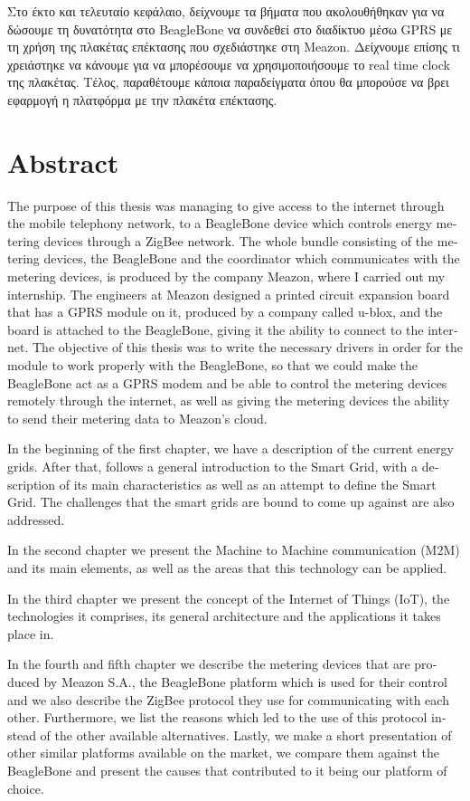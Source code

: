 \documentclass[12pt, a4paper, oneside]{report}
\begin{document}
Στο έκτο και τελευταίο κεφάλαιο, δείχνουμε τα βήματα που ακολουθήθηκαν για να δώσουμε τη δυνατότητα στο BeagleBone να συνδεθεί στο διαδίκτυο μέσω GPRS με τη χρήση της πλακέτας επέκτασης που σχεδιάστηκε στη Meazon. Δείχνουμε επίσης τι χρειάστηκε να κάνουμε για να μπορέσουμε να χρησιμοποιήσουμε το real time clock της πλακέτας. Τέλος, παραθέτουμε κάποια παραδείγματα όπου θα μπορούσε να βρει εφαρμογή η πλατφόρμα με την πλακέτα επέκτασης.

\clearpage
\section*{\textenglish{Abstract}}
\begin{english}The purpose of this thesis was managing to give access to the internet through the mobile telephony network, to a BeagleBone device which controls energy metering devices through a ZigBee network. The whole bundle consisting of the metering devices, the BeagleBone and the coordinator which communicates with the metering devices, is produced by the company Meazon, where I carried out my internship. The engineers at Meazon designed a printed circuit expansion board that has a GPRS module on it, produced by a company called u-blox, and the board is attached to the BeagleBone, giving it the ability to connect to the internet. The objective of this thesis was to write the necessary drivers in order for the module to work properly with the BeagleBone, so that we could make the BeagleBone act as a GPRS modem and be able to control the metering devices remotely through the internet, as well as giving the metering devices the ability to send their metering data to Meazon's cloud.

In the beginning of the f\mbox{}irst chapter, we have a description of the current energy grids. After that, follows a general introduction to the Smart Grid, with a description of its main characteristics as well as an attempt to def\mbox{}ine the Smart Grid. The challenges that the smart grids are bound to come up against are also addressed.

In the second chapter we present the Machine to Machine communication (M2M) and its main elements, as well as the areas that this technology can be applied.

In the third chapter we present the concept of the Internet of Things (IoT), the technologies it comprises, its general architecture and the applications it takes place in.

In the fourth and f\mbox{}ifth chapter we describe the metering devices that are produced by Meazon S.A., the BeagleBone platform which is used for their control and we also describe the ZigBee protocol they use for communicating with each other. Furthermore, we list the reasons which led to the use of this protocol instead of the other available alternatives. Lastly, we make a short presentation of other similar platforms available on the market, we compare them against the BeagleBone and present the causes that contributed to it being our platform of choice.


\end{english}
\end{document}
